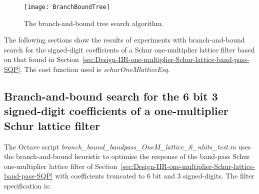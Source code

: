 \documentclass[a4paper,twoside,10pt,english]{report}
\begin{document}
\begin{figure}[!hb]
\begin{center}
\texttt{[image: BranchBoundTree]}
\caption{The branch-and-bound tree search algorithm. }
\label{fig:branch-bound-tree-search-algorithm}
\end{center}
\end{figure}

The following sections show the results of experiments with branch-and-bound
search for the signed-digit coefficients of a Schur one-multiplier lattice 
filter based on that found in 
Section~\ref{sec:Design-IIR-one-multiplier-Schur-lattice-band-pass-SQP}. The
cost function used is \emph{schurOneMlatticeEsq}.

\subsection{Branch-and-bound search for the 6 bit 3 signed-digit
coefficients of a one-multiplier Schur lattice filter}
The Octave script \emph{branch\_bound\_bandpass\_OneM\_lattice\_6\_nbits\_test.m}
uses the branch-and-bound heuristic to optimise the response of the band-pass 
Schur one-multiplier lattice filter of
Section~\ref{sec:Design-IIR-one-multiplier-Schur-lattice-band-pass-SQP} with 
coefficients truncated to $6$ bit and $3$ signed-digits. The filter 
specification is:
\begin{small}

\end{small}
\end{document}
